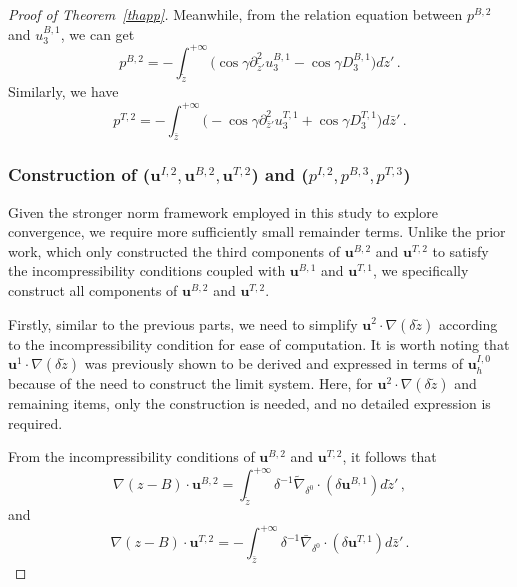 \documentclass[pdflatex,sn-mathphys-num]{sn-jnl}%
\theoremstyle{thmstyleone}%
\theoremstyle{thmstyletwo}%
\theoremstyle{thmstylethree}%
\theoremstyle{thmstyletwo}
\begin{document}
\begin{proof}[Proof of Theorem~{\upshape\ref{thapp}}]
Meanwhile, from the relation equation between $p^{B,2}$ and $u_3^{B,1}$, we can get
\begin{equation}\label{2.26}
	p^{B,2}=-\int_{\tilde{z}}^{+\infty}\big(
	\cos\gamma\partial_{\tilde{z}'}^2 u_3^{B,1}-\cos\gamma D_3^{B,1}
	\big)d\tilde{z}'\,.
\end{equation}
Similarly, we have
\begin{equation}\label{2.27}
	p^{T,2}=-\int_{\bar{z}}^{+\infty}\big(
	-\cos\gamma\partial_{\bar{z}'}^2 u_3^{T,1}+\cos\gamma D_3^{T,1}
	\big)d\bar{z}'\,.
\end{equation}






\subsubsection{Construction of ($\boldsymbol{u}^{I,2}, \boldsymbol{u}^{B,2}, \boldsymbol{u}^{T,2}$)  and (${p}^{I,2}, {p}^{B,3}, {p}^{T,3}$)}\label{subsec2.2.3}	


Given the stronger norm framework employed in this study to explore convergence, we require more sufficiently small remainder terms. 
Unlike the prior work, which only constructed the third components of $\boldsymbol{u}^{B,2}$ and $\boldsymbol{u}^{T,2}$ to satisfy the incompressibility conditions coupled with $\boldsymbol{u}^{B,1}$ and $\boldsymbol{u}^{T,1}$, we specifically construct all components of $\boldsymbol{u}^{B,2}$ and $\boldsymbol{u}^{T,2}$.






Firstly, similar to the previous parts, we need to simplify 
$\boldsymbol{u}^{2}\cdot\nabla(\delta\tilde{z})$
according to the incompressibility condition for ease of computation.
It is worth noting that $\boldsymbol{u}^{1}\cdot\nabla(\delta\tilde{z})$ was previously shown to be derived and expressed in terms of $\boldsymbol{u}^{I,0}_h$ because of the need to construct the limit system. 
Here, for $\boldsymbol{u}^{2}\cdot\nabla(\delta\tilde{z})$ and remaining items, only the construction is needed, and no detailed expression is required.





From the incompressibility conditions of $\boldsymbol{u}^{B,2}$ and $\boldsymbol{u}^{T,2}$, it follows that
\begin{equation*}
	\nabla(z-B)\cdot\boldsymbol{u}^{B,2}=
	\int_{\tilde{z}}^{+\infty}
	\delta^{-1}\tilde{\nabla}_{\delta^0}
	\cdot(\delta\boldsymbol{u}^{B,1})
	d\tilde{z}'\,,
\end{equation*}
and
\begin{equation*}
	\nabla(z-B)\cdot\boldsymbol{u}^{T,2}=
	-\int_{\bar{z}}^{+\infty}
	\delta^{-1}\bar{\nabla}_{\delta^0}
	\cdot(\delta\boldsymbol{u}^{T,1})
	d\bar{z}'\,.
\end{equation*}



\end{proof}
\end{document}
